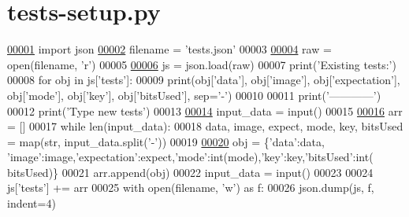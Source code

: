 \hypertarget{tests-setup_8py}{\section{tests-\/setup.py}
\label{tests-setup_8py}
}

\begin{DoxyCode}
\hypertarget{tests-setup_8py_source_l00001}{}\hyperlink{namespacetests-setup}{00001} \textcolor{keyword}{import} json
\hypertarget{tests-setup_8py_source_l00002}{}\hyperlink{namespacetests-setup_a1c1b6d4c14026d664106586c65e10a94}{00002} filename = \textcolor{stringliteral}{'tests.json'}
00003 
\hypertarget{tests-setup_8py_source_l00004}{}\hyperlink{namespacetests-setup_a1788203b7bbd6108e09617328eaeceb9}{00004} raw = open(filename, \textcolor{stringliteral}{'}\textcolor{stringliteral}{r')}
00005 \textcolor{stringliteral}{}
\hypertarget{tests-setup_8py_source_l00006}{}\hyperlink{namespacetests-setup_a08da0efe29fc9ddaa5f121eda9688b6d}{00006} \textcolor{stringliteral}{js = json.load(raw)}
00007 \textcolor{stringliteral}{print(}\textcolor{stringliteral}{'Existing tests:'})
00008 \textcolor{keywordflow}{for} obj \textcolor{keywordflow}{in} js[\textcolor{stringliteral}{'tests'}]:
00009     print(obj[\textcolor{stringliteral}{'data'}], obj[\textcolor{stringliteral}{'image'}], obj[\textcolor{stringliteral}{'expectation'}], obj[\textcolor{stringliteral}{'mode'}], obj[\textcolor{stringliteral}{'key'}], obj[\textcolor{stringliteral}{'bitsUsed'}], sep=\textcolor{stringliteral}{'-'})
00010 
00011 print(\textcolor{stringliteral}{'------------'})
00012 print(\textcolor{stringliteral}{'Type new tests'})
00013 
\hypertarget{tests-setup_8py_source_l00014}{}\hyperlink{namespacetests-setup_afd542601d7bb174d46d247a6b8f52580}{00014} input\_data = input()
00015 
\hypertarget{tests-setup_8py_source_l00016}{}\hyperlink{namespacetests-setup_a274aaa7c0d5733ef5f48372d9481f34a}{00016} arr = []
00017 \textcolor{keywordflow}{while} len(input\_data):
00018     data, image, expect, mode, key, bitsUsed = map(str, input\_data.split(\textcolor{stringliteral}{'-'}))
00019 
\hypertarget{tests-setup_8py_source_l00020}{}\hyperlink{namespacetests-setup_afb80c1236926b5468a6d3e942a527a96}{00020}     obj = \{\textcolor{stringliteral}{'data'}:data, \textcolor{stringliteral}{'image'}:image,\textcolor{stringliteral}{'expectation'}:expect,\textcolor{stringliteral}{'mode'}:int(mode),\textcolor{stringliteral}{'key'}:key,\textcolor{stringliteral}{'bitsUsed'}:int(
      bitsUsed)\}
00021     arr.append(obj)
00022     input\_data = input()
00023 
00024 js[\textcolor{stringliteral}{'tests'}] += arr
00025 with open(filename, \textcolor{stringliteral}{'w'}) \textcolor{keyword}{as} f:
00026     json.dump(js, f, indent=4)
\end{DoxyCode}
